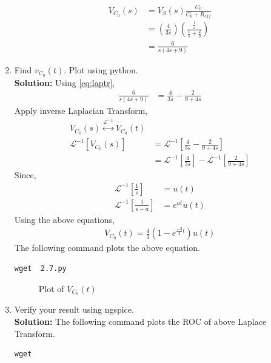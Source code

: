 \documentclass[journal,12pt,twocolumn]{IEEEtran}
\newcommand{\solution}{\noindent \textbf{Solution: }}
\providecommand{\brak}[1]{\ensuremath{\left(#1\right)}}
\providecommand{\system}[1]{\overset{\mathcal{#1}}{ \longleftrightarrow}}
\providecommand{\laplaceinv}[1]{{\mathcal{L}^{-1}\ensuremath{\left[#1\right]}}}
\numberwithin{equation}{section}
\renewcommand\thesection{\arabic{section}}
\begin{document}
\begin{enumerate}[label=\arabic*.,ref=\thesection.\theenumi]
\begin{align}
V_{C_0}(s)&=V_{S}(s)\frac{C_{0}}{C_{0}+R_{eff}}\\
&=\brak{\frac{4}{3s}}\brak{\frac{\frac{1}{s}}{\frac{1}{s}+\frac23}}\\
\label{eq:laptr}
&=\frac{6}{s\brak{4s+9}}
\end{align}
	\item Find $v_{C_0}(t)$.  Plot using python.\\
	\solution Using \eqref{eq:laptr},
	\begin{align}
	\frac{6}{s\brak{4s+9}}&=\frac{4}{3s}-\frac{2}{9+4s}
	\end{align}
	Apply inverse Laplacian Transform,
	\begin{align}
	V_{C_0}(s)\system{L^{-1}}V_{C_0}(t)\\
	\laplaceinv{V_{C_0}(s)}&=\laplaceinv{\frac{4}{3s}-\frac{2}{9+4s}}\\
&=	\laplaceinv{\frac{4}{3s}}-\laplaceinv{\frac{2}{9+4s}}
\end{align}
Since,
\begin{align}
\laplaceinv{\frac1s}&=u(t)\\
\laplaceinv{\frac{1}{s-a}}&=e^{at}u(t)
\end{align}
Using the above equations,
\begin{align}
V_{C_0}(t)=\frac{4}{3}\brak{ 1-e^{\frac{-3}{2} t}}u(t)
	\end{align}
	The following command plots the above equation.
	\begin{lstlisting}
wget  2.7.py	
\end{lstlisting}
	\begin{figure}[!ht]
			\centering
			\caption{Plot of $V_{C_0}(t)$}
\end{figure}
	\item Verify your result using ngspice.\\
	\solution The following command plots the ROC of above Laplace Transform.
	\begin{lstlisting}
wget 
\end{lstlisting}
\begin{figure}[!ht]
			\centering
			\caption{}
			\label{fig:ckt}
\end{figure}
\end{enumerate}
\end{document}
